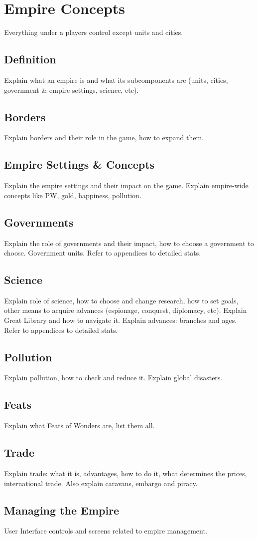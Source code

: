 \chapter{Empire Concepts}
Everything under a players control except units and cities.

\section{Definition}
Explain what an empire is and what its subcomponents are (units, cities,
government \& empire settings, science, etc).

\section{Borders}
Explain borders and their role in the game, how to expand them.

\section{Empire Settings \& Concepts}
Explain the empire settings and their impact on the game. Explain empire-wide
concepts like PW, gold, happiness, pollution.

\section{Governments}
Explain the role of governments and their impact, how to choose a government to
choose. Government units. Refer to appendices to detailed stats.

\section{Science}
Explain role of science, how to choose and change research, how to set goals,
other means to acquire advances (espionage, conquest, diplomacy, etc). Explain
Great Library and how to navigate it. Explain advances: branches and ages.
Refer to appendices to detailed stats.

\section{Pollution}
Explain pollution, how to check and reduce it. Explain global disasters.

\section{Feats}
Explain what Feats of Wonders are, list them all.

\section{Trade}
Explain trade: what it is, advantages, how to do it, what determines the
prices, international trade. Also explain caravans, embargo and piracy.

\section{Managing the Empire}
User Interface controls and screens related to empire management.


